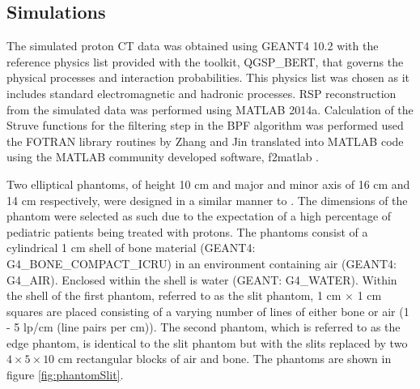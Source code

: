 \documentclass[11pt,a4paper]{article}
\begin{document}


\subsection{Simulations}
The simulated proton CT data was obtained using GEANT4 10.2 \cite{agostinelli2003geant4} with the reference physics list provided with the toolkit, QGSP\_BERT, that governs the physical processes and interaction probabilities. This physics list was chosen as it includes standard electromagnetic and hadronic processes. RSP reconstruction from the simulated data was performed using MATLAB 2014a. Calculation of the Struve functions for the filtering step in the BPF algorithm was performed used the FOTRAN library routines by Zhang and Jin \cite{zhang16computation} translated into MATLAB code using the MATLAB community developed software, f2matlab \cite{f2matlab}.

Two elliptical phantoms, of height 10 cm and major and minor axis of 16 cm and 14 cm respectively, were designed in a similar manner to \cite{li2006reconstruction}. The dimensions of the phantom were selected as such due to the expectation of a high percentage of pediatric patients being treated with protons. The phantoms consist of a cylindrical 1 cm shell of bone material (GEANT4: G4\_BONE\_COMPACT\_ICRU) in an environment containing air (GEANT4: G4\_AIR). Enclosed within the shell is water (GEANT: G4\_WATER). Within the shell of the first phantom, referred to as the slit phantom, 1 cm $\times$ 1 cm squares are placed consisting of a varying number of lines of either bone or air (1 - 5 lp/cm (line pairs per cm)). The second phantom, which is referred to as the edge phantom, is identical to the slit phantom but with the slits replaced by two $4 \times 5 \times 10$ cm rectangular blocks of air and bone. The phantoms are shown in figure \ref{fig:phantomSlit}.
\end{document}
